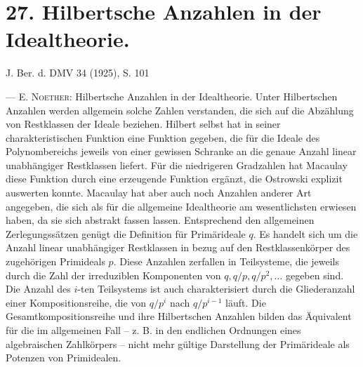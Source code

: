 \section*{27. Hilbertsche Anzahlen in der Idealtheorie.}

\begin{center}
J. Ber. d. DMV 34 (1925), S. 101
\end{center}

--- \textsc{E. Noether}: Hilbertsche Anzahlen in der Idealtheorie. Unter Hilbertschen Anzahlen werden allgemein solche Zahlen verstanden, die sich auf die Abzählung von Restklassen der Ideale beziehen. Hilbert selbst hat in seiner \glqq{}charakteristischen Funktion\grqq{} eine Funktion gegeben, die für die Ideale des Polynombereichs jeweils von einer gewissen Schranke an die genaue Anzahl linear unabhängiger Restklassen liefert. Für die niedrigeren Gradzahlen hat Macaulay diese Funktion durch eine erzeugende Funktion ergänzt, die Ostrowski explizit auswerten konnte. Macaulay hat aber auch noch Anzahlen anderer Art angegeben, die sich als für die allgemeine Idealtheorie am wesentlichsten erwiesen haben, da sie sich abstrakt fassen lassen. Entsprechend den allgemeinen Zerlegungssätzen genügt die Definition für Primärideale $q$. Es handelt sich um die Anzahl linear unabhängiger Restklassen in bezug auf den Restklassenkörper des zugehörigen Primideals $p$. Diese Anzahlen zerfallen in Teilsysteme, die jeweils durch die Zahl der irreduziblen Komponenten von $q,q/p,q/p^2,\ldots$ gegeben sind. Die Anzahl des $i$-ten Teilsystems ist auch charakterisiert durch die Gliederanzahl einer Kompositionsreihe, die von $q/p^i$ nach $q/p^{i-1}$ läuft. Die Gesamtkompositionsreihe und ihre Hilbertschen Anzahlen bilden das Äquivalent für die im allgemeinen Fall -- z. B. in den endlichen Ordnungen eines algebraischen Zahlkörpers -- nicht mehr gültige Darstellung der Primärideale als Potenzen von Primidealen.

\clearpage
